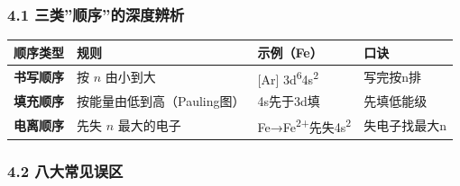 \documentclass[a4paper,11pt]{ctexart}
\newcounter{none}
\begin{document}
\subsubsection{4.1 三类''顺序''的深度辨析}\label{ux4e09ux7c7bux987aux5e8fux7684ux6df1ux5ea6ux8fa8ux6790}

{\def\LTcaptype{none} %
\begin{longtable}[]{@{}
  >{\raggedright\arraybackslash}p{}
  >{\raggedright\arraybackslash}p{}
  >{\raggedright\arraybackslash}p{}
  >{\raggedleft\arraybackslash}p{}@{}}
\toprule\noalign{}
\begin{minipage}[b]{\linewidth}\raggedright
顺序类型
\end{minipage} & \begin{minipage}[b]{\linewidth}\raggedright
规则
\end{minipage} & \begin{minipage}[b]{\linewidth}\raggedright
示例（Fe）
\end{minipage} & \begin{minipage}[b]{\linewidth}\raggedleft
口诀
\end{minipage} \\
\midrule\noalign{}
\endhead
\bottomrule\noalign{}
\endlastfoot
\textbf{书写顺序} & 按 \(n\) 由小到大 & {[}Ar{]} 3d\textsuperscript{6}4s\textsuperscript{2} & 写完按n排 \\
\textbf{填充顺序} & 按能量由低到高（Pauling图） & 4s先于3d填 & 先填低能级 \\
\textbf{电离顺序} & 先失 \(n\) 最大的电子 & Fe→Fe\textsuperscript{2+}先失4s\textsuperscript{2} & 失电子找最大n \\
\end{longtable}
}

\subsubsection{4.2 八大常见误区}\label{ux516bux5927ux5e38ux89c1ux8befux533a}
\end{document}
